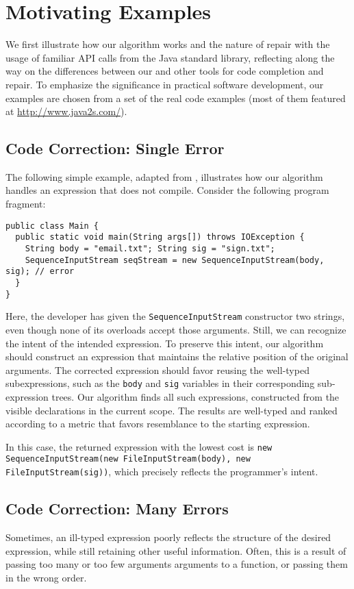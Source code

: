 \section{Motivating Examples}
\label{sec:examples}
We first illustrate how our algorithm works and the nature of repair with the usage of familiar API calls from the Java standard library, reflecting along the way on the differences between our and other tools for code completion and repair. To emphasize the significance in practical software development, our examples are chosen from a set of the real code examples (most of them featured at \url{http://www.java2s.com/}{}).

\subsection{Code Correction: Single Error}
\label{sec:examples:single}
The following simple example, adapted from \cite{GveroETAL13CompleteCompletionTypesWeights}, illustrates how our algorithm handles an expression that does not compile. Consider the following program fragment:
\begin{lstlisting}
public class Main {
  public static void main(String args[]) throws IOException {
    String body = "email.txt"; String sig = "sign.txt";
    SequenceInputStream seqStream = new SequenceInputStream(body, sig); // error
  }
} 
\end{lstlisting}
Here, the developer has given the \lstinline{SequenceInputStream} constructor two strings, even though none of its overloads accept those arguments. Still, we can recognize the intent of the intended expression. To preserve this intent, our algorithm should construct an expression that maintains the relative position of the original arguments. The corrected expression should favor reusing the well-typed subexpressions, such as the \lstinline{body} and \lstinline{sig} variables in their corresponding sub-expression trees. Our algorithm finds all such expressions, constructed from the visible declarations in the current scope. The results are well-typed and ranked according to a metric that favors resemblance to the starting expression.

In this case, the returned expression with the lowest cost is \lstinline{new SequenceInputStream(new FileInputStream(body), new FileInputStream(sig))}, which precisely reflects the programmer's intent.

\subsection{Code Correction: Many Errors}
\label{sec:examples:many}
Sometimes, an ill-typed expression poorly reflects the structure of the desired expression, while still retaining other useful information. Often, this is a result of passing too many or too few arguments arguments to a function, or passing them in the wrong order.

